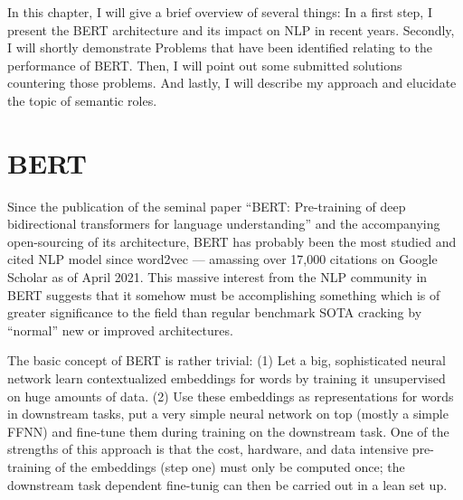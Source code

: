 \label{chap:2_approach}



In this chapter, I will give a brief overview of several things: In a first step, I present
the BERT architecture and its impact on NLP in recent years. Secondly, I will shortly demonstrate
Problems that have been identified relating to the performance of BERT. Then, I will point out
some submitted solutions countering those problems. And lastly, I will describe my approach and
elucidate the topic of semantic roles.

\section{BERT}

Since the publication of the seminal paper ``BERT: Pre-training of deep bidirectional transformers
for language understanding'' \cite{devlin2018bert} and the accompanying open-sourcing of its
architecture, BERT has probably been the
most studied and cited NLP model since word2vec \cite{mikolov2013distributed} --- amassing over
17,000 citations on Google Scholar as of April 2021. This massive interest from the NLP community
in BERT suggests that it somehow must be accomplishing something which is of greater significance
to the field than regular benchmark SOTA cracking by ``normal'' new or improved architectures.


The basic concept of BERT is rather trivial: (1) Let a big, sophisticated neural network learn
contextualized embeddings for words by training it unsupervised on huge amounts of data. (2)
Use these embeddings as representations for words in downstream tasks, put a very simple neural
network on top (mostly a simple FFNN) and fine-tune them during training on the downstream task.
One of the strengths of this approach is that the cost, hardware, and data intensive pre-training of the
embeddings (step one) must only be computed once; the downstream task dependent fine-tunig can then
be carried out in a lean set up.

